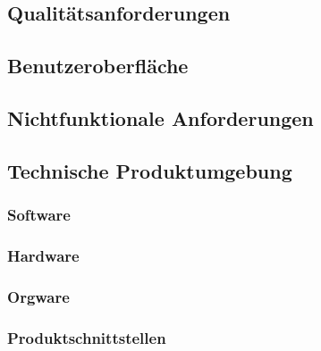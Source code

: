 \subsection{Qualitätsanforderungen}


\subsection{Benutzeroberfläche}


\subsection{Nichtfunktionale Anforderungen}


\subsection{Technische Produktumgebung}

	\subsubsection{Software}
	
	\subsubsection{Hardware}
	
	\subsubsection{Orgware}

	\subsubsection{Produktschnittstellen}